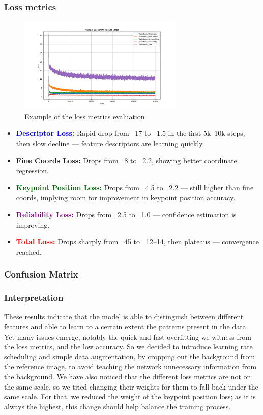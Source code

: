 \subsubsection{Loss metrics}
\begin{figure}[H]
    \centering
    \includegraphics[width=0.7\textwidth]{ressources/multiple_losses_graph_2.png}
    \caption{Example of the loss metrics evaluation}
    \label{fig:loss_metrics_2}
\end{figure}
\begin{itemize}
    \item \textcolor{blue}{\textbf{Descriptor Loss:}} Rapid drop from ~17 to ~1.5 in the first 5k–10k steps, then slow decline — feature descriptors are learning quickly.
    \item \textcolor{myorange}{\textbf{Fine Coords Loss:}} Drops from ~8 to ~2.2, showing better coordinate regression.
    \item \textcolor{darkgreen}{\textbf{Keypoint Position Loss:}} Drops from ~4.5 to ~2.2 — still higher than fine coords, implying room for improvement in keypoint position accuracy.
    \item \textcolor{purple}{\textbf{Reliability Loss:}} Drops from ~2.5 to ~1.0 — confidence estimation is improving.
    \item \textcolor{red}{\textbf{Total Loss:}} Drops sharply from ~45 to ~12–14, then plateaus — convergence reached.
\end{itemize}
\subsubsection{Confusion Matrix}
\subsubsection{Interpretation}
These results indicate that the model is able to distinguish between different
features and able to learn to a certain extent the patterns present in the
data. Yet many issues emerge, notably the quick and fast overfitting we witness
from the loss metrics, and the low accuracy. So we decided to introduce
learning rate scheduling and simple data augmentation, by cropping out the
background from the reference image, to avoid teaching the network unnecessary
information from the background. We have also noticed that the different loss
metrics are not on the same scale, so we tried changing their weights for them
to fall back under the same scale. For that, we reduced the weight of the
keypoint position loss; as it is always the highest, this change should help
balance the training process.
